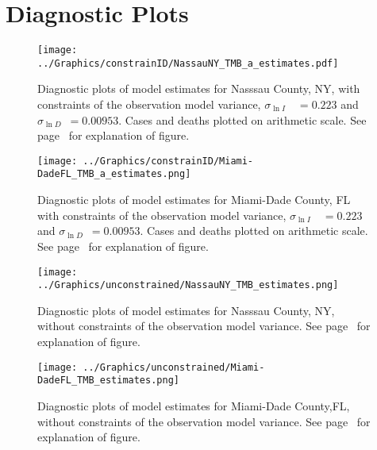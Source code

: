 \documentclass[12pt,letterpaper]{article}
\newcommand\slI{$\sigma_{\ln I}$\ }
\newcommand\slD{$\sigma_{\ln D}$}
\begin{document}
\begin{appendices}
\begin{sidewaystable}
{%
}\end{sidewaystable}



\clearpage
\section{Diagnostic Plots}

\begin{figure}[h!]
\begin{center}
\texttt{[image: ../Graphics/constrainID/NassauNY\_TMB\_a\_estimates.pdf]}
\end{center}
\caption{\label{fig:estsNaNYca}
Diagnostic plots of model estimates for Nasssau County, NY, 
with constraints of the observation model variance, 
\slI~$ = 0.223$ and \slD~$= 0.00953$. 
Cases and deaths plotted on arithmetic scale.
See page~\pageref{pp:diagexpl} for explanation of figure.
}
\end{figure}
\clearpage

\begin{figure}
\begin{center}
\texttt{[image: ../Graphics/constrainID/Miami-DadeFL\_TMB\_a\_estimates.png]}
\end{center}
\caption{\label{fig:estsMDFLca}
Diagnostic plots of model estimates for Miami-Dade County, FL
with constraints of the observation model variance, 
\slI~$ = 0.223$ and \slD~$= 0.00953$. 
Cases and deaths plotted on arithmetic scale.
See page~\pageref{pp:diagexpl} for explanation of figure.
}
\end{figure}

\begin{figure}[h!]
\begin{center}
\texttt{[image: ../Graphics/unconstrained/NassauNY\_TMB\_estimates.png]}
\end{center}
\caption{\label{fig:estsNaNYu}
Diagnostic plots of model estimates for Nasssau County, NY, 
without constraints of the observation model variance. 
See page~\pageref{pp:diagexpl} for explanation of figure.
}
\end{figure}
\clearpage

\begin{figure}
\begin{center}
\texttt{[image: ../Graphics/unconstrained/Miami-DadeFL\_TMB\_estimates.png]}
\end{center}
\caption{\label{fig:estsMDFLu}
Diagnostic plots of model estimates for Miami-Dade County,FL,
without constraints of the observation model variance. 
See page~\pageref{pp:diagexpl} for explanation of figure.
}
\end{figure}

\end{appendices}
\end{document}
